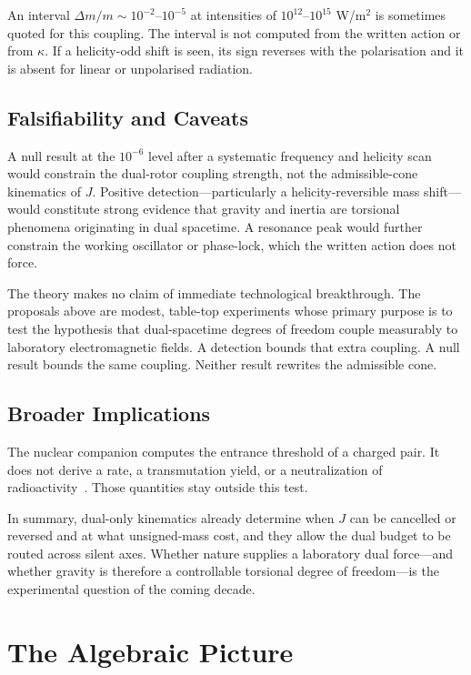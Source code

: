 \documentclass[a4paper]{article}
\begin{document}
An interval \(\Delta m / m \sim 10^{-2}\)--\(10^{-5}\) at intensities of \(10^{12}\)--\(10^{15}\) W/m\(^2\) is sometimes quoted for this coupling. The interval is not computed from the written action or from \(\kappa\). If a helicity-odd shift is seen, its sign reverses with the polarisation and it is absent for linear or unpolarised radiation.

\subsection{Falsifiability and Caveats}

A null result at the $10^{-6}$ level after a systematic frequency and helicity scan would constrain the dual-rotor coupling strength, not the admissible-cone kinematics of $J$. Positive detection---particularly a helicity-reversible mass shift---would constitute strong evidence that gravity and inertia are torsional phenomena originating in dual spacetime. A resonance peak would further constrain the working oscillator or phase-lock, which the written action does not force.

The theory makes no claim of immediate technological breakthrough. The proposals above are modest, table-top experiments whose primary purpose is to test the hypothesis that dual-spacetime degrees of freedom couple measurably to laboratory electromagnetic fields. A detection bounds that extra coupling. A null result bounds the same coupling. Neither result rewrites the admissible cone.

\subsection{Broader Implications}

The nuclear companion computes the entrance threshold of a charged pair. It does not derive a rate, a transmutation yield, or a neutralization of radioactivity~\cite{dst-strong}. Those quantities stay outside this test.

In summary, dual-only kinematics already determine when $J$ can be cancelled or reversed and at what unsigned-mass cost, and they allow the dual budget to be routed across silent axes. Whether nature supplies a laboratory dual force---and whether gravity is therefore a controllable torsional degree of freedom---is the experimental question of the coming decade.

\section{The Algebraic Picture}
\label{sec:status}
\end{document}
